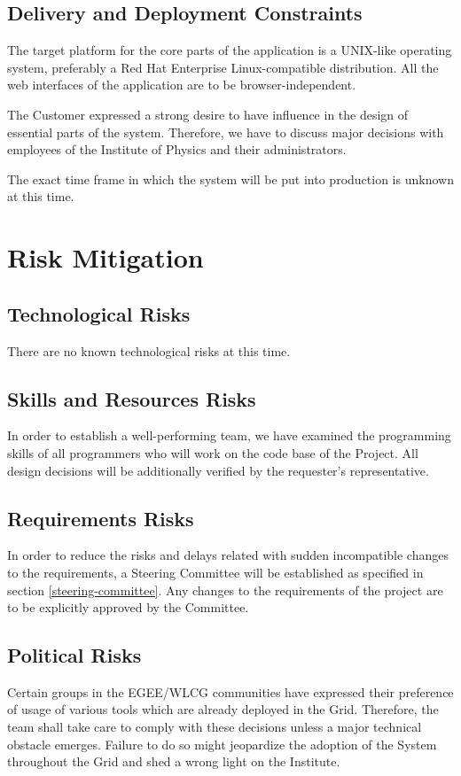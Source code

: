 \documentclass[12pt]{article}
\begin{document}
\subsection{Delivery and Deployment Constraints}
The target platform for the core parts of the application is a UNIX-like
operating system, preferably a Red Hat Enterprise Linux-compatible distribution.
All the web interfaces of the application are to be browser-independent.

The Customer expressed a strong desire to have influence in the design of
essential parts of the system.   Therefore, we have to discuss major decisions
with employees of the Institute of Physics and their administrators.

The exact time frame in which the system will be put into production is unknown
at this time.

\section{Risk Mitigation}

\subsection{Technological Risks}
There are no known technological risks at this time.

\subsection{Skills and Resources Risks}
In order to establish a well-performing team, we have examined the programming
skills of all programmers who will work on the code base of the Project.  All
design decisions will be additionally verified by the requester's
representative.

\subsection{Requirements Risks}
In order to reduce the risks and delays related with sudden incompatible changes
to the requirements, a Steering Committee will be established as specified in
section \ref{steering-committee}.  Any changes to the requirements of the
project are to be explicitly approved by the Committee.

\subsection{Political Risks}
Certain groups in the EGEE/WLCG communities have expressed their preference of
usage of various tools which are already deployed in the Grid.  Therefore, the
team shall take care to comply with these decisions unless a major technical
obstacle emerges.  Failure to do so might jeopardize the adoption of the System
throughout the Grid and shed a wrong light on the Institute.
\end{document}
